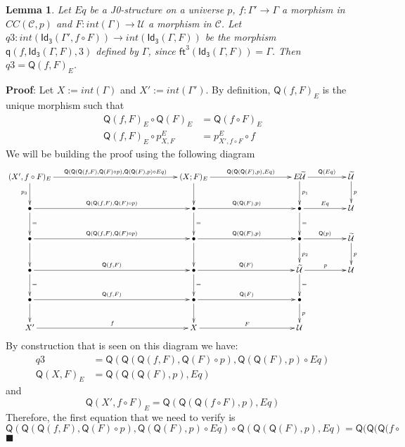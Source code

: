 \documentclass[12pt]{article}
\numberwithin{equation}{section}
\newenvironment{myproof}{{\bf Proof}:}{$\blacksquare$ \vskip 5mm }
\newtheorem{lemma}[proposition]{Lemma}
\newcommand{\sr}{\rightarrow}
\newcommand{\wt}{\widetilde}
\newcommand{\BB}{{\bullet}}
\newcommand{\toCC}{CC} %
\newcommand{\C}{{\mathcal C}}  %
\newcommand{\ft}{\mathsf{ft}}
\newcommand{\q}{\mathsf{q}}
\newcommand{\Idx}{\mathsf{Id_3}} %
\newcommand{\U}{\mathcal{U}}
\newcommand{\Q}{\mathsf{Q}}
\begin{document}
\begin{lemma}
\label{2015.04.04.l4} Let $Eq$ be a J0-structure on a universe $p$,
$f:\Gamma'\sr \Gamma$ a morphism in $\toCC({\C},p)$ and $F:int(\Gamma)\sr
\U$ a morphism in $\C$.  Let $q3:int(\Idx(\Gamma',f\circ F))\sr
int(\Idx(\Gamma,F))$ be the morphism $\q(f,\Idx(\Gamma,F),3)$ defined by
$\Gamma$, since $\ft^3(\Idx(\Gamma,F))=\Gamma$. Then $q3=\Q(f,F)_{E}$.
\end{lemma}
%
\begin{myproof}
Let $X:=int(\Gamma)$ and $X':=int(\Gamma')$. By definition, $\Q(f,F)_{E}$ is the
unique morphism such that
%
\begin{align*}
  \Q(f,F)_{E}\circ \Q(F)_{E}&=\Q(f\circ F)_{E} \\
  \Q(f,F)_{E}\circ p^{E}_{X,F}&=p^{E}_{X',f\circ F}\circ f
\end{align*}
%
We will be building the proof using the following diagram
%
$$
\begin{xy}
          \xymatrix@C=4pc{ (X',f\circ F)_{E} \ar[rrr]^-{\Q(\Q(\Q(f,F),\Q(F)\circ
              p),\Q(\Q(F),p)\circ Eq)} \ar[d]_{p_3} &&& (X;F)_{E}
            \ar[rr]^-{\Q(\Q(\Q(F),p),Eq)} \ar[d] && E\wt{\U} \ar[r]^-{\Q(Eq)}
            \ar[d]^{p_1} & \wt{\U} \ar[d]^{p}\\ \BB
            \ar[rrr]^-{\Q(\Q(f,F),\Q(F)\circ p)} \ar[d]^{=} &&& \BB
            \ar[rr]^-{\Q(\Q(F),p)} \ar[d]^{=} && \BB \ar[r]^-{Eq} \ar[d]^{=}&
            \U\\ \BB \ar[rrr]^-{\Q(\Q(f,F),\Q(F)\circ p)} \ar[d] &&& \BB
            \ar[rr]^-{\Q(\Q(F),p)} \ar[d] && \BB \ar[r]^-{\Q(p)} \ar[d]^{p_2}&
            \wt{\U} \ar[d]^{p}\\ \BB \ar[rrr]^-{\Q(f,F)} \ar[d]^{=}&&& \BB
            \ar[rr]^-{\Q(F)} \ar[d]^{=} && \wt{\U} \ar[r]^-{p} \ar[d]^{=} & \U
            \\ \BB \ar[rrr]^-{\Q(f,F)} \ar[d] &&& \BB \ar[rr]^-{\Q(F)} \ar[d] &&
            \BB \ar[d]^{p}\\ X' \ar[rrr]^-{f} &&& X \ar[rr]^-{F} && \U }
\end{xy}
$$
%
By construction that is seen on this diagram we have:
%
\begin{align*}
  q3&=\Q(\Q(\Q(f,F),\Q(F)\circ p),\Q(\Q(F),p)\circ Eq) \\
  \Q(X,F)_{E}&=\Q(\Q(\Q(F),p),Eq)
\end{align*}
%
and
%
$$\Q(X', f\circ F)_{E}=\Q(\Q(\Q(f\circ F),p),Eq)$$
%
Therefore, the first equation that we need to verify is
%
$$\Q(\Q(\Q(f,F),\Q(F)\circ p),\Q(\Q(F),p)\circ Eq)\circ \Q(\Q(\Q(F),p),Eq)=\Q(\Q(\Q(f\circ
$$
\end{myproof}
\end{document}
